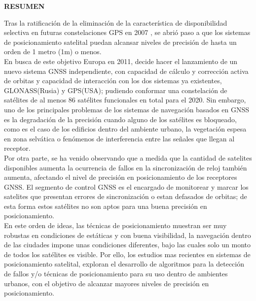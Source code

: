 \thispagestyle{empty}


\begin{center}
\Large\centering\bfseries
\textsc{RESUMEN}
\end{center}

Tras la ratificación de la eliminación de la característica de disponibilidad selectiva en futuras constelaciones GPS en 2007 %
, se abrió paso a que los sistemas de posicionamiento satelital puedan alcansar niveles de precisión de hasta un orden de 1 metro (1m) o menos.\\

En busca de este objetivo Europa en 2011, decide hacer el lanzamiento de un nuevo sistema GNSS independiente, con capacidad de cálculo y corrección activa de orbitas y capacidad de interacción con los dos sistemas ya existentes, GLONASS(Rusia) y GPS(USA); pudiendo conformar una constelación de satélites de al menos 86 satélites funcionales en total para el 2020. Sin embargo, uno de los principales problemas de los sistemas de navegación basados en GNSS es la degradación de la precisión cuando alguno de los satélites es bloqueado, como es el caso de los edificios dentro del ambiente urbano, la vegetación espesa en zona selvática o fenómenos de interferencia entre las señales que llegan al receptor.\\

Por otra parte, se ha venido observando que a medida que la cantidad de satelites disponibles aumenta la ocurrencia de fallos en la sincronización de reloj también aumenta, afectando el nivel de precisión en posicionamiento de los receptores GNSS. El segmento de control GNSS es el encargado de monitorear y marcar los satelites que presentan errores de sincronización o estan defasados de orbitas; de esta forma estos satélites no son aptos para una buena precisión en posicionamiento.\\

En este orden de ideas, las técnicas de posicionamiento muestran ser muy robustas en condiciones de estáticas y con buena visibilidad, la navegación dentro de las ciudades impone unas condiciones diferentes, bajo las cuales solo un monto de todos los satélites es visible. Por ello, los estudios mas recientes en sistemas de posicionamiento satelital, exploran el desarrollo de algoritmos para la detección de fallos y/o técnicas de posicionamiento para su uso dentro de ambientes urbanos, con el objetivo de alcanzar mayores niveles de precisión en posicionamiento.\\

